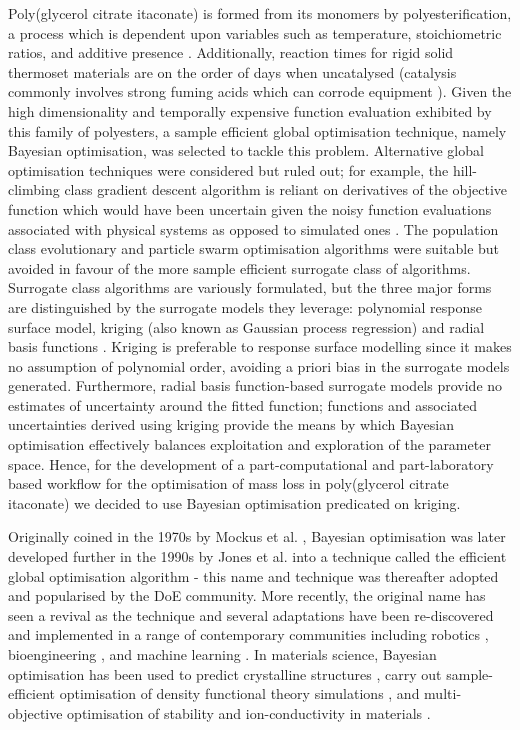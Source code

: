 Poly(glycerol citrate itaconate) is formed from its monomers by
 polyesterification, a process which is dependent upon variables
 such as temperature, stoichiometric ratios, and additive presence 
 \autocite{Alberts2017}.
Additionally, reaction times for rigid solid thermoset materials are on the
 order of days when uncatalysed 
 \autocite{Trenkel2008} (catalysis commonly
 involves strong fuming acids which can corrode 
 equipment \autocite{Shukla2022}).
Given the high dimensionality and temporally expensive function evaluation 
 exhibited by this family of polyesters, a sample efficient global
 optimisation technique, namely Bayesian optimisation, was selected to 
 tackle this problem.
Alternative global optimisation techniques were considered but ruled out;
 for example, the hill-climbing class gradient descent algorithm is reliant on
 derivatives of the objective function which would have
 been uncertain given the noisy function evaluations associated
 with physical systems as opposed to simulated ones \autocite{Stork2022}.
The population class evolutionary and particle swarm optimisation algorithms
 were suitable but avoided in favour of the more sample efficient surrogate
 class of algorithms.
Surrogate class algorithms are variously formulated, but the three major
 forms are distinguished by the surrogate models they leverage: polynomial
 response surface model, kriging (also known as Gaussian process regression)
 and radial basis functions \autocite{Roeva2012}.
Kriging is preferable to response surface modelling since it makes no
 assumption of polynomial order, avoiding a priori bias in the 
 surrogate models generated.
Furthermore, radial basis function-based surrogate models provide no
 estimates of uncertainty around the fitted function; functions and
 associated uncertainties derived using kriging provide the means by which
 Bayesian optimisation effectively balances exploitation and exploration of
 the parameter space.
Hence, for the development of a part-computational and 
 part-laboratory based workflow for the optimisation of mass loss in 
 poly(glycerol citrate itaconate) we decided to use Bayesian optimisation
 predicated on kriging.

Originally coined in the 1970s by Mockus et al. \autocite{Mockus1978}, Bayesian 
 optimisation was later developed further in the 1990s by Jones et al. into a 
 technique called the efficient global optimisation algorithm
 \autocite{Jones1998}- this name and technique was thereafter adopted and
 popularised by the DoE community.
More recently, the original name has seen a revival as the technique and
 several adaptations have been re-discovered and implemented in a range
 of contemporary communities including robotics \autocite{Calandra2016},
 bioengineering \autocite{Bader2023}, and machine learning \autocite{Cho2020}.
In materials science, Bayesian optimisation has been used to predict 
 crystalline structures \autocite{Yamashita2018}, carry out sample-efficient 
 optimisation of density functional theory simulations 
 \autocite{Balachandran2016}, and multi-objective optimisation of stability 
 and ion-conductivity in materials \autocite{Karasuyama2020}.

